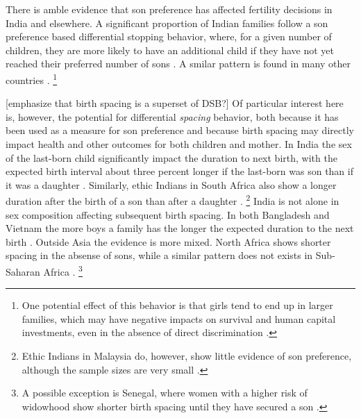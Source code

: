 There is amble evidence that son preference has affected fertility decisions in India and 
elsewhere.
A significant proportion of Indian families follow a son preference based differential 
stopping behavior, where, for a given number of children, they are more likely to have an 
additional child if they have not yet reached their preferred number of sons 
\citep{repetto72,Das1987,Arnold1997,arnold98,clark00,Basu2010,Barcellos2014}.
A smilar pattern is found in many other countries 
\citep[see, for example][]{larsen98,filmer09,Altindag2016}.%
\footnote{
One potential effect of this behavior is that girls tend to end up in larger families, 
which may have negative impacts on survival and human capital investments, even in 
the absence of direct discrimination \citet{Jensen2003,Kugler2017}.
}

[emphasize that birth spacing is a superset of DSB?]
Of particular interest here is, however, the potential for differential \emph{spacing} 
behavior, 
both because it has been used as a measure for son preference and because birth spacing 
may directly impact health and other outcomes for both children and mother.
In India the sex of the last-born child significantly impact the duration to next birth,
with the expected birth interval about three percent longer if the last-born was son than
if it was a daughter \citep{Bhalotra2008,Kumar2016}.
Similarly, ethic Indians in South Africa also show a longer duration after the birth of a 
son than after a daughter \citep{Gangadharan2003}.%
\footnote{
Ethic Indians in Malaysia do, however, show little evidence of son preference, although
the sample sizes are very small \citep{Pong1994}.
}
India is not alone in sex composition affecting subsequent birth spacing.
In both Bangladesh and Vietnam the more boys a family has the longer the expected duration 
to the next birth \citep{Haughton1995,Haughton1996,Rahman1993,Soest2018}.
Outside Asia the evidence is more mixed.
North Africa shows shorter spacing in the absense of sons, while a similar pattern does
not exists in Sub-Saharan Africa \citep{Rossi2015}.%
\footnote{
A possible exception is Senegal, where women with a higher risk of widowhood show
shorter birth spacing until they have secured a son \citep{Lambert2016}.
}

